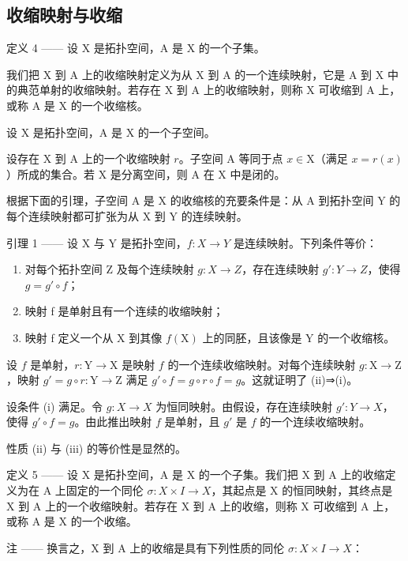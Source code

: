 \subsection{收缩映射与收缩}

定义 4 —— 设 X 是拓扑空间，A 是 X 的一个子集。

我们把 X 到 A 上的收缩映射定义为从 X 到 A 的一个连续映射，它是 A 到 X 中的典范单射的收缩映射。若存在 X 到 A 上的收缩映射，则称 X 可收缩到 A 上，或称 A 是 X 的一个收缩核。

设 X 是拓扑空间，A 是 X 的一个子空间。

设存在 X 到 A 上的一个收缩映射 \(r\)。子空间 A 等同于点 \(x \in \mathrm{X}\)（满足 \(x = r(x)\)）所成的集合。若 X 是分离空间，则 A 在 X 中是闭的。

根据下面的引理，子空间 A 是 X 的收缩核的充要条件是：从 A 到拓扑空间 Y 的每个连续映射都可扩张为从 X 到 Y 的连续映射。

引理 1 —— 设 X 与 Y 是拓扑空间，\(f\colon X\to Y\) 是连续映射。下列条件等价：

\begin{enumerate}
\def\labelenumi{(\roman{enumi})}
\item
  对每个拓扑空间 Z 及每个连续映射 \(g: X \to Z\)，存在连续映射 \(g': Y \to Z\)，使得 \(g = g' \circ f\)；
\item
  映射 f 是单射且有一个连续的收缩映射；
\item
  映射 f 定义一个从 X 到其像 \(f(\mathrm{X})\) 上的同胚，且该像是 Y 的一个收缩核。
\end{enumerate}

设 \(f\) 是单射，\(r: \mathrm{Y} \to \mathrm{X}\) 是映射 \(f\) 的一个连续收缩映射。对每个连续映射 \(g: \mathrm{X} \to \mathrm{Z}\)，映射 \(g' = g \circ r: \mathrm{Y} \to \mathrm{Z}\) 满足 \(g' \circ f = g \circ r \circ f = g\)。这就证明了 (ii)⇒(i)。

设条件 (i) 满足。令 \(g \colon X \to X\) 为恒同映射。由假设，存在连续映射 \(g' \colon Y \to X\)，使得 \(g' \circ f = g\)。由此推出映射 \(f\) 是单射，且 \(g'\) 是 \(f\) 的一个连续收缩映射。

性质 (ii) 与 (iii) 的等价性是显然的。

定义 5 —— 设 X 是拓扑空间，A 是 X 的一个子集。我们把 X 到 A 上的收缩定义为在 A 上固定的一个同伦 \(\sigma\colon X\times I\to X\)，其起点是 X 的恒同映射，其终点是 X 到 A 上的一个收缩映射。若存在 X 到 A 上的收缩，则称 X 可收缩到 A 上，或称 A 是 X 的一个收缩。

注 —— 换言之，X 到 A 上的收缩是具有下列性质的同伦 \(\sigma\colon X \times I \to X\)：

